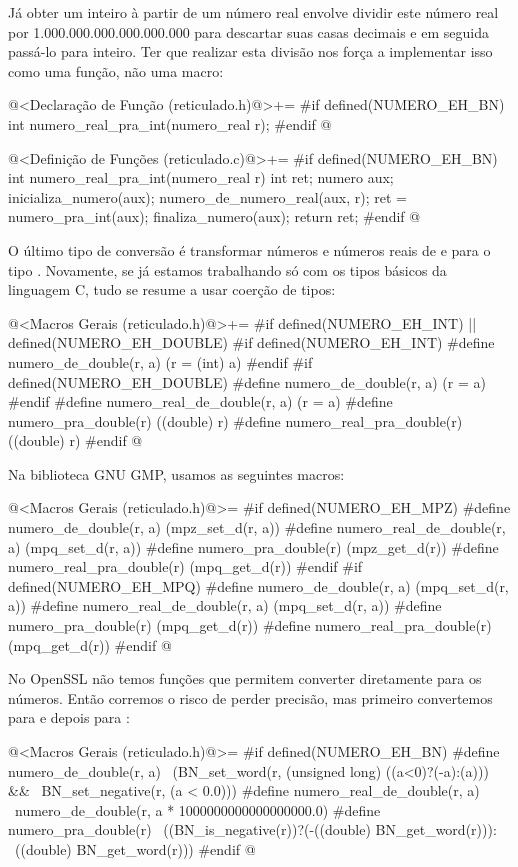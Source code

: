 Já obter um inteiro à partir de um número real envolve dividir este
número real por 1.000.000.000.000.000.000 para descartar suas casas
decimais e em seguida passá-lo para inteiro. Ter que realizar esta
divisão nos força a implementar isso como uma função, não uma macro:

\iniciocodigo
@<Declaração de Função (reticulado.h)@>+=
#if defined(NUMERO_EH_BN)
int numero_real_pra_int(numero_real r);
#endif
@
\fimcodigo

\iniciocodigo
@<Definição de Funções (reticulado.c)@>+=
#if defined(NUMERO_EH_BN)
int numero_real_pra_int(numero_real r){
  int ret;
  numero aux;
  inicializa_numero(aux);
  numero_de_numero_real(aux, r);
  ret = numero_pra_int(aux);
  finaliza_numero(aux);
  return ret;
}
#endif
@
\fimcodigo

O último tipo de conversão é transformar números e números reais de e
para o tipo . Novamente, se já estamos trabalhando
só com os tipos básicos da linguagem C, tudo se resume a usar coerção
de tipos:

\iniciocodigo
@<Macros Gerais (reticulado.h)@>+=
#if defined(NUMERO_EH_INT) || defined(NUMERO_EH_DOUBLE)
#if defined(NUMERO_EH_INT)
#define numero_de_double(r, a) (r = (int) a)
#endif
#if defined(NUMERO_EH_DOUBLE)
#define numero_de_double(r, a) (r = a)
#endif
#define numero_real_de_double(r, a) (r = a)
#define numero_pra_double(r) ((double) r)
#define numero_real_pra_double(r) ((double) r)
#endif
@
\fimcodigo

Na biblioteca GNU GMP, usamos as seguintes macros:


\iniciocodigo
@<Macros Gerais (reticulado.h)@>=
#if defined(NUMERO_EH_MPZ)
#define numero_de_double(r, a) (mpz_set_d(r, a))
#define numero_real_de_double(r, a) (mpq_set_d(r, a))
#define numero_pra_double(r) (mpz_get_d(r))
#define numero_real_pra_double(r) (mpq_get_d(r))
#endif
#if defined(NUMERO_EH_MPQ)
#define numero_de_double(r, a) (mpq_set_d(r, a))
#define numero_real_de_double(r, a) (mpq_set_d(r, a))
#define numero_pra_double(r) (mpq_get_d(r))
#define numero_real_pra_double(r) (mpq_get_d(r))
#endif
@
\fimcodigo

No OpenSSL não temos funções que permitem converter diretamente
para  os números. Então corremos o risco de perder
precisão, mas primeiro convertemos para  e depois
para :

\iniciocodigo
@<Macros Gerais (reticulado.h)@>=
#if defined(NUMERO_EH_BN)
#define numero_de_double(r, a)                                      \
              (BN_set_word(r, (unsigned long) ((a<0)?(-a):(a))) &&  \
               BN_set_negative(r, (a < 0.0)))
#define numero_real_de_double(r, a)                                 \
              numero_de_double(r, a * 1000000000000000000.0)
#define numero_pra_double(r)                                        \
              ((BN_is_negative(r))?(-((double) BN_get_word(r))):    \
                                   ((double) BN_get_word(r)))
#endif
@
\fimcodigo

